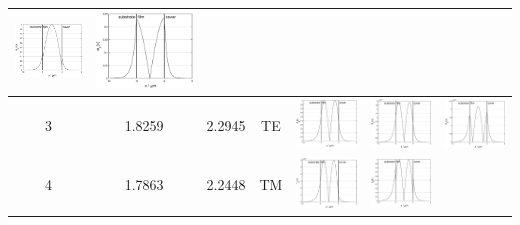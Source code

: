 \documentclass{assignment}
\begin{document}
\begin{sol}
\begin{itemize}
\begin{longtable}[c]{|c|c|c|c|c|c|c|}
      \includegraphics[width=.22\columnwidth]{Assignment-1-Problem-1-WaveGuide-2-ModalAnalysis-Mode-2-Ex.eps} &
      \includegraphics[width=.22\columnwidth]{Assignment-1-Problem-1-WaveGuide-2-ModalAnalysis-Mode-2-Ez.eps} \\ \hline
    3 &
      1.8259 &
      2.2945 &
      TE &
      \includegraphics[width=.22\columnwidth]{Assignment-1-Problem-1-WaveGuide-2-ModalAnalysis-Mode-3-Ey.eps} &
      \includegraphics[width=.22\columnwidth]{Assignment-1-Problem-1-WaveGuide-2-ModalAnalysis-Mode-3-Hx.eps} &
      \includegraphics[width=.22\columnwidth]{Assignment-1-Problem-1-WaveGuide-2-ModalAnalysis-Mode-3-Hz.eps} \\ \hline
    4 &
      1.7863 &
      2.2448 &
      TM &
      \includegraphics[width=.22\columnwidth]{Assignment-1-Problem-1-WaveGuide-2-ModalAnalysis-Mode-4-Hy.eps} &
      \includegraphics[width=.22\columnwidth]{Assignment-1-Problem-1-WaveGuide-2-ModalAnalysis-Mode-4-Ex.eps} &

\end{longtable}
\end{itemize}
\end{sol}
\end{document}
